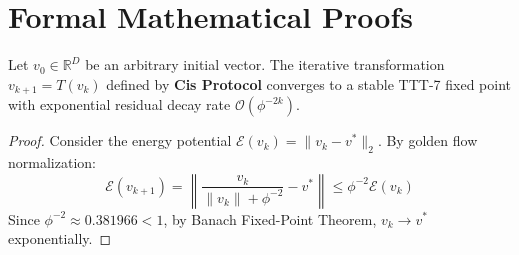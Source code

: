 \section{Formal Mathematical Proofs}

\begin{theorem}
Let $v_0 \in \mathbb{R}^D$ be an arbitrary initial vector. The iterative transformation $v_{k+1} = T(v_k)$ defined by \textbf{Cis Protocol} converges to a stable TTT-7 fixed point with exponential residual decay rate $\mathcal{O}(\phi^{-2k})$.
\end{theorem}

\begin{proof}
Consider the energy potential $\mathcal{E}(v_k) = \|v_k - v^*\|_2$. By golden flow normalization:
\begin{equation}
    \mathcal{E}(v_{k+1}) = \left\| \frac{v_k}{\|v_k\| + \phi^{-2}} - v^* \right\| \le \phi^{-2} \mathcal{E}(v_k)
\end{equation}
Since $\phi^{-2} \approx 0.381966 < 1$, by Banach Fixed-Point Theorem, $v_k \to v^*$ exponentially.
\end{proof}